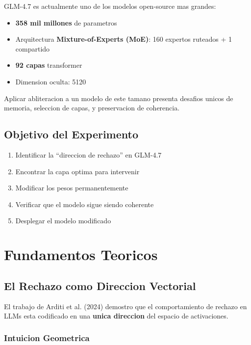 \documentclass[11pt,a4paper]{article}
\begin{document}
GLM-4.7 es actualmente uno de los modelos open-source mas grandes:

\begin{itemize}
    \item \textbf{358 mil millones} de parametros
    \item Arquitectura \textbf{Mixture-of-Experts (MoE)}: 160 expertos ruteados + 1 compartido
    \item \textbf{92 capas} transformer
    \item Dimension oculta: 5120
\end{itemize}

Aplicar abliteracion a un modelo de este tamano presenta desafios unicos de memoria, seleccion de capas, y preservacion de coherencia.

\subsection{Objetivo del Experimento}

\begin{enumerate}
    \item Identificar la ``direccion de rechazo'' en GLM-4.7
    \item Encontrar la capa optima para intervenir
    \item Modificar los pesos permanentemente
    \item Verificar que el modelo sigue siendo coherente
    \item Desplegar el modelo modificado
\end{enumerate}

\section{Fundamentos Teoricos}

\subsection{El Rechazo como Direccion Vectorial}

El trabajo de Arditi et al. (2024) demostro que el comportamiento de rechazo en LLMs esta codificado en una \textbf{unica direccion} del espacio de activaciones.

\subsubsection{Intuicion Geometrica}
\end{document}
